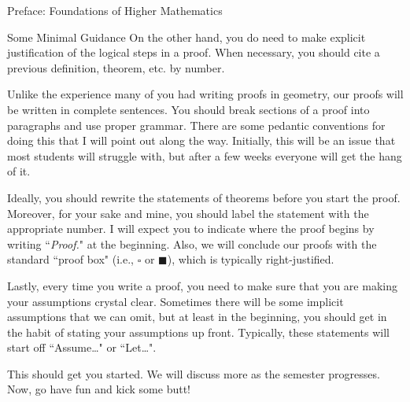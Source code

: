 \documentclass[11pt]{article}
\begin{document}
\begin{section}{Preface: Foundations of Higher Mathematics}
\begin{subsection}{Some Minimal Guidance}
On the other hand, you do need to make explicit justification of the logical steps in a proof.  When necessary, you should cite a previous definition, theorem, etc. by number.

Unlike the experience many of you had writing proofs in geometry, our proofs will be written in complete sentences.  You should break sections of a proof into paragraphs and use proper grammar.  There are some pedantic conventions for doing this that I will point out along the way.  Initially, this will be an issue that most students will struggle with, but after a few weeks everyone will get the hang of it.

Ideally, you should rewrite the statements of theorems before you start the proof.  Moreover, for your sake and mine, you should label the statement with the appropriate number.  I will expect you to indicate where the proof begins by writing ``\emph{Proof.}" at the beginning.  Also, we will conclude our proofs with the standard ``proof box" (i.e., $\square$ or $\blacksquare$), which is typically right-justified.

Lastly, every time you write a proof, you need to make sure that you are making your assumptions crystal clear.  Sometimes there will be some implicit assumptions that we can omit, but at least in the beginning, you should get in the habit of stating your assumptions up front.  Typically, these statements will start off ``Assume\ldots" or ``Let\ldots".  

This should get you started.  We will discuss more as the semester progresses.  Now, go have fun and kick some butt!

\end{subsection}

\end{section}
\end{document}
